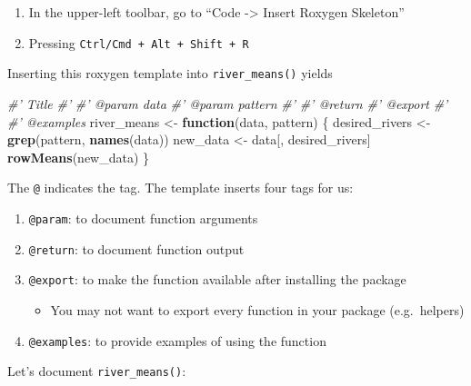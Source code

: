 \documentclass[
]{book}
\newenvironment{Shaded}{\begin{snugshade}}{\end{snugshade}}
\newcommand{\CommentTok}[1]{\textcolor[rgb]{0.56,0.35,0.01}{\textit{#1}}}
\newcommand{\ControlFlowTok}[1]{\textcolor[rgb]{0.13,0.29,0.53}{\textbf{#1}}}
\newcommand{\KeywordTok}[1]{\textcolor[rgb]{0.13,0.29,0.53}{\textbf{#1}}}
\newcommand{\NormalTok}[1]{#1}
\newcommand{\StringTok}[1]{\textcolor[rgb]{0.31,0.60,0.02}{#1}}
\providecommand{\tightlist}{%
  \setlength{\itemsep}{0pt}\setlength{\parskip}{0pt}}
\begin{document}
\begin{enumerate}
\def\labelenumi{\arabic{enumi}.}
\tightlist
\item
  In the upper-left toolbar, go to ``Code -\textgreater{} Insert Roxygen Skeleton''
\item
  Pressing \texttt{Ctrl/Cmd\ +\ Alt\ +\ Shift\ +\ R}
\end{enumerate}

Inserting this roxygen template into \texttt{river\_means()} yields

\begin{Shaded}
\begin{Highlighting}[]
\CommentTok{#' Title}
\CommentTok{#'}
\CommentTok{#' @param data }
\CommentTok{#' @param pattern }
\CommentTok{#'}
\CommentTok{#' @return}
\CommentTok{#' @export}
\CommentTok{#'}
\CommentTok{#' @examples}
\NormalTok{river_means <-}\StringTok{ }\ControlFlowTok{function}\NormalTok{(data, pattern) \{}
\NormalTok{  desired_rivers <-}\StringTok{ }\KeywordTok{grep}\NormalTok{(pattern, }\KeywordTok{names}\NormalTok{(data))}
\NormalTok{  new_data <-}\StringTok{ }\NormalTok{data[, desired_rivers]}
  \KeywordTok{rowMeans}\NormalTok{(new_data)}
\NormalTok{\}}
\end{Highlighting}
\end{Shaded}

The \texttt{@} indicates the tag. The template inserts four tags for us:

\begin{enumerate}
\def\labelenumi{\arabic{enumi}.}
\tightlist
\item
  \texttt{@param}: to document function arguments
\item
  \texttt{@return}: to document function output
\item
  \texttt{@export}: to make the function available after installing the package

  \begin{itemize}
  \tightlist
  \item
    You may not want to export every function in your package (e.g.~helpers)
  \end{itemize}
\item
  \texttt{@examples}: to provide examples of using the function
\end{enumerate}

Let's document \texttt{river\_means()}:
\end{document}
